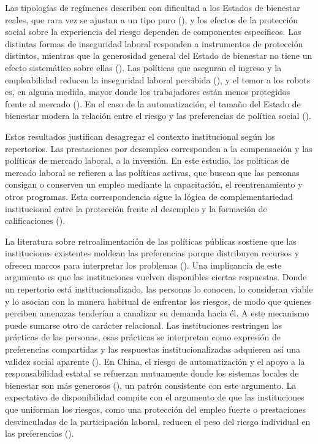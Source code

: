 \documentclass[
  spanish,
  12pt,
]{article}
\begin{document}
Las tipologías de regímenes describen con dificultad a los Estados de
bienestar reales, que rara vez se ajustan a un tipo puro
(), y los efectos
de la protección social sobre la experiencia del riesgo dependen de
componentes específicos. Las distintas formas de inseguridad laboral
responden a instrumentos de protección distintos, mientras que la
generosidad general del Estado de bienestar no tiene un efecto
sistemático sobre ellas (). Las políticas que aseguran el ingreso y la
empleabilidad reducen la inseguridad laboral percibida
(), y
el temor a los robots es, en alguna medida, mayor donde los trabajadores
están menos protegidos frente al mercado
(). En el caso de la
automatización, el tamaño del Estado de bienestar modera la relación
entre el riesgo y las preferencias de política social
().

Estos resultados justifican desagregar el contexto institucional según
los repertorios. Las prestaciones por desempleo corresponden a la
compensación y las políticas de mercado laboral, a la inversión. En este
estudio, las políticas de mercado laboral se refieren a las políticas
activas, que buscan que las personas consigan o conserven un empleo
mediante la capacitación, el reentrenamiento y otros programas. Esta
correspondencia sigue la lógica de complementariedad institucional entre
la protección frente al desempleo y la formación de calificaciones
().

La literatura sobre retroalimentación de las políticas públicas sostiene
que las instituciones existentes moldean las preferencias porque
distribuyen recursos y ofrecen marcos para interpretar los problemas
(). Una implicancia de
este argumento es que las instituciones vuelven disponibles ciertas
respuestas. Donde un repertorio está institucionalizado, las personas lo
conocen, lo consideran viable y lo asocian con la manera habitual de
enfrentar los riesgos, de modo que quienes perciben amenazas tenderían a
canalizar su demanda hacia él. A este mecanismo puede sumarse otro de
carácter relacional. Las instituciones restringen las prácticas de las
personas, esas prácticas se interpretan como expresión de preferencias
compartidas y las respuestas institucionalizadas adquieren así una
validez social aparente (). En China, el riesgo de automatización y el apoyo a la
responsabilidad estatal se refuerzan mutuamente donde los sistemas
locales de bienestar son más generosos (), un patrón consistente con este argumento. La expectativa
de disponibilidad compite con el argumento de que las instituciones que
uniforman los riesgos, como una protección del empleo fuerte o
prestaciones desvinculadas de la participación laboral, reducen el peso
del riesgo individual en las preferencias
().
\end{document}
